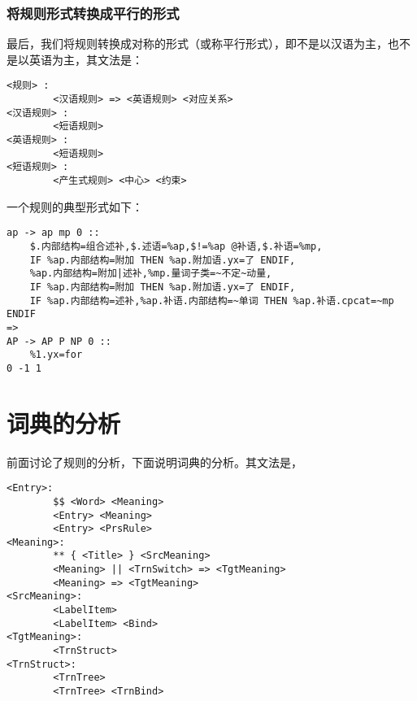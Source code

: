 \documentclass{article}
\begin{document}
\begin{CJK}{UTF8}{gbsn}
\begin{center}
\end{center}

\subsubsection{将规则形式转换成平行的形式}

最后，我们将规则转换成对称的形式（或称平行形式），即不是以汉语为主，也不是以英语为主，其文法是：

\begin{verbatim}
<规则> : 
        <汉语规则> => <英语规则> <对应关系>
<汉语规则> :
        <短语规则>
<英语规则> :
        <短语规则>
<短语规则> :
        <产生式规则> <中心> <约束>
\end{verbatim}

一个规则的典型形式如下：
\begin{verbatim}
ap -> ap mp 0 :: 
    $.内部结构=组合述补,$.述语=%ap,$!=%ap @补语,$.补语=%mp, 
    IF %ap.内部结构=附加 THEN %ap.附加语.yx=了 ENDIF,
    %ap.内部结构=附加|述补,%mp.量词子类=~不定~动量, 
    IF %ap.内部结构=附加 THEN %ap.附加语.yx=了 ENDIF, 
    IF %ap.内部结构=述补,%ap.补语.内部结构=~单词 THEN %ap.补语.cpcat=~mp ENDIF
=>
AP -> AP P NP 0 :: 
    %1.yx=for
0 -1 1 
\end{verbatim}

\section{词典的分析}

前面讨论了规则的分析，下面说明词典的分析。其文法是，

\begin{verbatim}
<Entry>:
        $$ <Word> <Meaning>
        <Entry> <Meaning>
        <Entry> <PrsRule>
<Meaning>:
        ** { <Title> } <SrcMeaning>
        <Meaning> || <TrnSwitch> => <TgtMeaning>
        <Meaning> => <TgtMeaning>
<SrcMeaning>:
        <LabelItem>
        <LabelItem> <Bind>
<TgtMeaning>:
        <TrnStruct>
<TrnStruct>:
        <TrnTree>
        <TrnTree> <TrnBind>
\end{verbatim}


\end{CJK}
\end{document}
